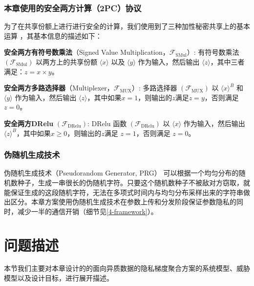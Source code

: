 \subsubsection{本章使用的安全两方计算（2PC）协议}
为了在共享份额上进行进行安全的计算，我们使用到了三种加性秘密共享上的基本运算 \cite{rathee2021sirnn}，其基本信息的描述如下：
\begin{compactitem}
    \item \textbf{安全两方有符号数乘法}（Signed Value Multiplication，$\mathcal{F}_{\text{SMul}}$）: 有符号数乘法 $(\mathcal{F}_{\text{SMul}})$ 以两方上的共享份额 $\langle x\rangle$ 以及 $\langle y\rangle$ 作为输入，然后输出 $\langle z\rangle$，其中三者满足：$z = x \times y$。
    \item \textbf{安全两方多路选择器}（Multiplexer，$\mathcal{F}_{\text{MUX}}$）: 多路选择器 $(\mathcal{F}_{\text{MUX}})$ 以 $\langle x\rangle^B$ 和 $\langle y\rangle$ 作为输入，然后输出 $\langle z\rangle$，其中如果$x = 1$，则输出的$z$满足$z = y$，否则满足$z = 0$。 
    \item \textbf{安全两方DRelu} $(\mathcal{F}_{\text{DRelu}})$: DRelu 函数 $(\mathcal{F}_{\text{DRelu}})$ 以 $\langle x\rangle$ 作为输入，然后输出 $\langle z\rangle^B$，其中如果$x \geq 0$，则输出的$z$满足 $z = 1$，否则满足 $z = 0$。
\end{compactitem}

\subsubsection{伪随机生成技术}
伪随机生成技术（Pseudorandom Generator, PRG）\cite{yao1982theory} 可以根据一个均匀分布的随机数种子，生成一串很长的伪随机字符。只要这个随机数种子不被敌对方窃取，就能保证生成的这段随机字符，无法在多项式时间内与均匀分布采样出来的字符串做出区分。本章方案使用伪随机生成技术在参数上传和分发阶段保证参数隐私的同时，减少一半的通信开销（细节见\ref{4-framework}）。

\section{问题描述}\label{4-problem}
本节我们主要对本章设计的的面向异质数据的隐私梯度聚合方案的系统模型、威胁模型以及设计目标，进行展开描述。

